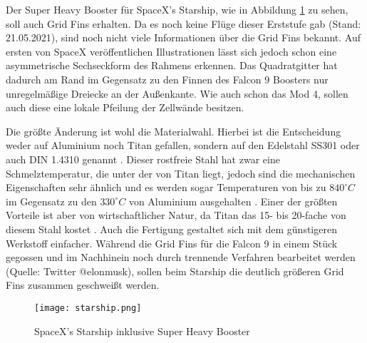 Der Super Heavy Booster für SpaceX's Starship, wie in Abbildung \ref{abb_starship} zu sehen, soll auch Grid Fins erhalten. Da es noch keine Flüge dieser Erststufe gab (Stand: 21.05.2021), sind noch nicht viele Informationen über die Grid Fins bekannt. Auf ersten von SpaceX veröffentlichen Illustrationen lässt sich jedoch schon eine asymmetrische Sechseckform des Rahmens erkennen. Das Quadratgitter hat dadurch am Rand im Gegensatz zu den Finnen des Falcon 9 Boosters nur unregelmäßige Dreiecke an der Außenkante. Wie auch schon das Mod 4, sollen auch diese eine lokale Pfeilung der Zellwände besitzen.

Die größte Änderung ist wohl die Materialwahl. Hierbei ist die Entscheidung weder auf Aluminium noch Titan gefallen, sondern auf den Edelstahl SS301 oder auch DIN 1.4310 genannt \cite{titanium}. Dieser rostfreie Stahl hat zwar eine Schmelztemperatur, die unter der von Titan liegt, jedoch sind die mechanischen Eigenschaften sehr ähnlich und es werden sogar Temperaturen von bis zu $840^\circ C$ im Gegensatz zu den $330^\circ C$ von Aluminium ausgehalten \cite{titanium}. Einer der größten Vorteile ist aber von wirtschaftlicher Natur, da Titan das 15- bis 20-fache von diesem Stahl kostet \cite{titanium}. Auch die Fertigung gestaltet sich mit dem günstigeren Werkstoff einfacher. Während die Grid Fins für die Falcon 9 in einem Stück gegossen und im Nachhinein noch durch trennende Verfahren bearbeitet werden (Quelle: Twitter @elonmusk), sollen beim Starship die deutlich größeren Grid Fins zusammen geschweißt werden.
\begin{figure}[h]
	\centering
	\texttt{[image: starship.png]}
	\begin{flushright}
	\end{flushright}
	\caption{SpaceX's Starship inklusive Super Heavy Booster}
	\label{abb_starship}
\end{figure}\\
